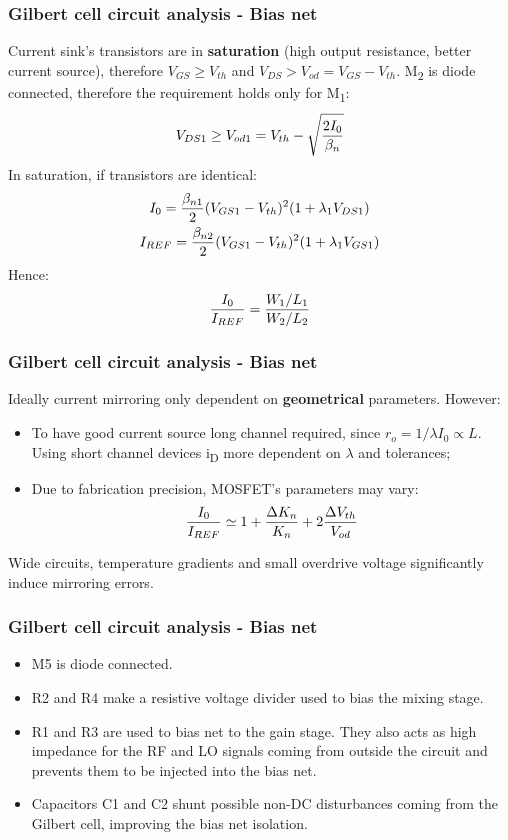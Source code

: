 \begin{frame}
	\frametitle{Gilbert cell circuit analysis - Bias net}
	Current sink's transistors are in \textbf{saturation} (high output resistance, better current source), therefore $V_{GS}\geq V_{th}$ and $V_{DS}>V_{od} = V_{GS}-V_{th}$. M\textsubscript{2} is diode connected, therefore the requirement holds only for M\textsubscript{1}:
	\begin{equation}
	V_{DS1}\geq V_{od1}= V_{th}-\sqrt{\frac{2I_0}{\beta_{n}}} \notag
	\end{equation}
	In saturation, if transistors are identical:
	\begin{gather}
	I_0 = \frac{\beta_{n1}}{2}(V_{GS1}-V_{th})^2(1+\lambda_1V_{DS1}) \notag \\
	I_{REF} = \frac{\beta_{n2}}{2}(V_{GS1}-V_{th})^2(1+\lambda_1V_{GS1}) \notag
	\end{gather}
	Hence: 
	\begin{equation}
	\frac{I_0}{I_{REF}} = \frac{W_1/L_1}{W_2/L_2} \notag
	\end{equation}
\end{frame}

\begin{frame}
	\frametitle{Gilbert cell circuit analysis - Bias net}
	Ideally current mirroring only dependent on \textbf{geometrical} parameters. However:
	\begin{itemize}
		\item To have good current source long channel required, since $r_o=1/\lambda I_0\propto L$. Using short channel devices i\textsubscript{D} more dependent on $\lambda$ and tolerances;
		\item Due to fabrication precision, MOSFET's parameters may vary:
		\begin{equation}
		\frac{I_0}{I_{REF}} \simeq 1 + \frac{\Delta K_n}{K_n}+2\frac{\Delta V_{th}}{V_{od}} \notag
		\end{equation}
	\end{itemize}
	Wide circuits, temperature gradients and small overdrive voltage significantly induce mirroring errors.
\end{frame}
\begin{frame}
	\frametitle{Gilbert cell circuit analysis - Bias net}
	\begin{itemize}
		\item M5 is diode connected.
		\item R2 and R4 make a resistive voltage divider used to bias the mixing stage.
		\item R1 and R3 are used to bias net to the gain stage. They also acts as high impedance for the RF and LO signals coming from outside the circuit and prevents them to be injected into the bias net.
		\item Capacitors C1 and C2 shunt possible non-DC disturbances coming from the Gilbert cell, improving the bias net isolation.
	\end{itemize}
\end{frame}


